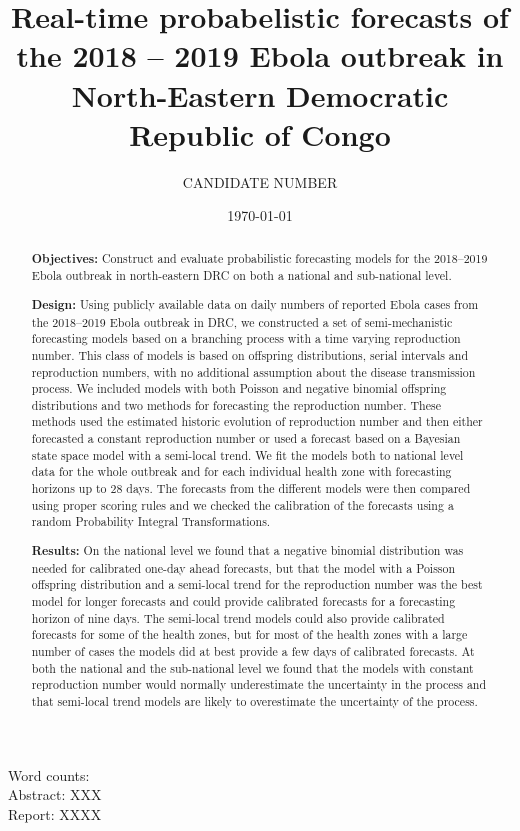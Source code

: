 \documentclass[12pt]{article}
\title{Real-time probabelistic forecasts of the 2018 -- 2019 Ebola outbreak in North-Eastern Democratic \\Republic of Congo}
\author{
  CANDIDATE NUMBER
}
\date{\today}
\begin{document}
\maketitle


Word counts:\\
Abstract: XXX\\
Report: XXXX

\begin{abstract}
  {\bf Objectives:} Construct and evaluate probabilistic forecasting models for the 2018--2019 Ebola outbreak in north-eastern DRC on both a national and sub-national level.
  
  \medskip
  
  {\bf Design:} Using publicly available data on daily numbers of reported Ebola cases from the 2018--2019 Ebola outbreak in DRC, we constructed a set of semi-mechanistic forecasting models based on a branching process with a time varying reproduction number. This class of models is based on offspring distributions, serial intervals and reproduction numbers, with no additional assumption about the disease transmission process. We included models with both Poisson and negative binomial offspring distributions and two methods for forecasting the reproduction number. These methods used the estimated historic evolution of reproduction number and then either forecasted a constant reproduction number or used a forecast based on a Bayesian state space model with a semi-local trend. We fit the models both to national level data for the whole outbreak and for each individual health zone with forecasting horizons up to 28 days. The forecasts from the different models were then compared using proper scoring rules and we checked the calibration of the forecasts using a random Probability Integral Transformations. 

  \medskip
  
  {\bf Results:} On the national level we found that a negative binomial distribution was needed for calibrated one-day ahead forecasts, but that the model with a Poisson offspring distribution and a semi-local trend for the reproduction number was the best model for longer forecasts and could provide calibrated forecasts for a forecasting horizon of nine days. The semi-local trend models could also provide calibrated forecasts for some of the health zones, but for most of the health zones with a large number of cases the models did at best provide a few days of calibrated forecasts. At both the national and the sub-national level we found that the models with constant reproduction number would normally underestimate the uncertainty in the process and that semi-local trend models are likely to overestimate the uncertainty of the process. 


\end{abstract}
\end{document}
